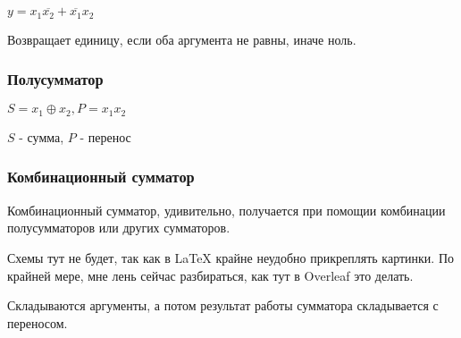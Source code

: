 \documentclass{article}
\begin{document}
$y = x_1\overline{x_2} + \overline{x_1}x_2$

Возвращает единицу, если оба аргумента не равны, иначе ноль.

\subsubsection{Полусумматор}

$S = x_1 \oplus x_2, P = x_{1}x_{2}$

$S$ - сумма, $P$ - перенос

\subsubsection{Комбинационный сумматор}

Комбинационный сумматор, удивительно, получается при помощии комбинации полусумматоров или других сумматоров.

Схемы тут не будет, так как в LaTeX крайне неудобно прикреплять картинки. По крайней мере, мне лень сейчас разбираться, как тут в Overleaf это делать.

Складываются аргументы, а потом результат работы сумматора складывается с переносом.
\end{document}
